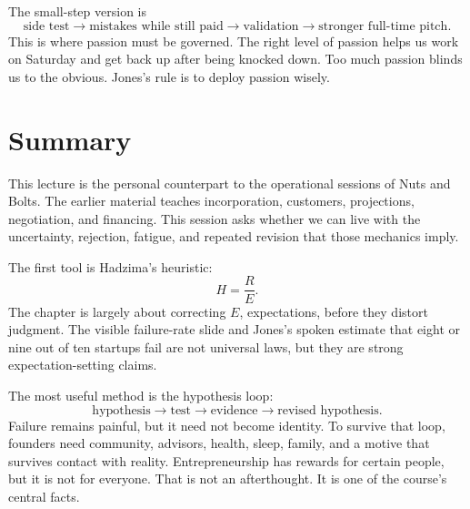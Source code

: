 The small-step version is
\begin{equation}
\text{side test}
\longrightarrow
\text{mistakes while still paid}
\longrightarrow
\text{validation}
\longrightarrow
\text{stronger full-time pitch}.
\end{equation}
This is where passion must be governed. The right level of passion helps us work on Saturday and get back up after being knocked down. Too much passion blinds us to the obvious. Jones's rule is to deploy passion wisely.

\section{Summary}

This lecture is the personal counterpart to the operational sessions of Nuts and Bolts. The earlier material teaches incorporation, customers, projections, negotiation, and financing. This session asks whether we can live with the uncertainty, rejection, fatigue, and repeated revision that those mechanics imply.

The first tool is Hadzima's heuristic:
\[
H=\frac{R}{E}.
\]
The chapter is largely about correcting \(E\), expectations, before they distort judgment. The visible failure-rate slide and Jones's spoken estimate that eight or nine out of ten startups fail are not universal laws, but they are strong expectation-setting claims.

The most useful method is the hypothesis loop:
\[
\text{hypothesis}
\rightarrow
\text{test}
\rightarrow
\text{evidence}
\rightarrow
\text{revised hypothesis}.
\]
Failure remains painful, but it need not become identity. To survive that loop, founders need community, advisors, health, sleep, family, and a motive that survives contact with reality. Entrepreneurship has rewards for certain people, but it is not for everyone. That is not an afterthought. It is one of the course's central facts.